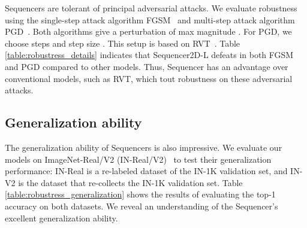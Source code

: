 \documentclass{article}
\begin{document}
Sequencers are tolerant of principal adversarial attacks. We evaluate robustness using the single-step attack algorithm FGSM~\cite{goodfellow2014explaining} and multi-step attack algorithm PGD~\cite{madry2017towards}. Both algorithms give a perturbation of max magnitude . For PGD, we choose steps  and step size . This setup is based on RVT~\cite{mao2021towards}. Table \ref{table:robustress_details} indicates that Sequencer2D-L defeats in both FGSM and PGD compared to other models. Thus, Sequencer has an advantage over conventional models, such as RVT, which tout robustness on these adversarial attacks.

\subsection{Generalization ability}
\label{subsec:gen}
The generalization ability of Sequencers is also impressive. We evaluate our models on ImageNet-Real/V2 (IN-Real/V2)~\cite{beyer2020we, recht2019imagenet} to test their generalization performance: IN-Real is a re-labeled dataset of the IN-1K validation set, and IN-V2 is the dataset that re-collects the IN-1K validation set. Table \ref{table:robustress_generalization} shows the results of evaluating the top-1 accuracy on both datasets. We reveal an understanding of the Sequencer's excellent generalization ability.
\end{document}

